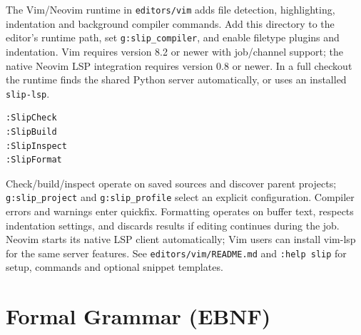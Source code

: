 \documentclass[lang=en,11pt]{elegantbook}
\newcommand{\code}[1]{\texttt{#1}}
\begin{document}
The Vim/Neovim runtime in \code{editors/vim} adds file detection, highlighting,
indentation and background compiler commands. Add this directory to the editor's
runtime path, set \code{g:slip\_compiler}, and enable filetype plugins and indentation.
Vim requires version 8.2 or newer with job/channel support; the native Neovim LSP
integration requires version 0.8 or newer. In a full checkout the runtime finds
the shared Python server automatically, or uses an installed \code{slip-lsp}.
\begin{lstlisting}[language=bash]
:SlipCheck
:SlipBuild
:SlipInspect
:SlipFormat
\end{lstlisting}
Check/build/inspect operate on saved sources and discover parent projects;
\code{g:slip\_project} and \code{g:slip\_profile} select an explicit configuration.
Compiler errors and warnings enter quickfix. Formatting operates on buffer text,
respects indentation settings, and discards results if editing continues during
the job. Neovim starts its native LSP client automatically; Vim users can install
vim-lsp for the same server features. See \code{editors/vim/README.md} and
\code{:help slip} for setup, commands and optional snippet templates.

\appendix

\chapter{Formal Grammar (EBNF)}
\end{document}
